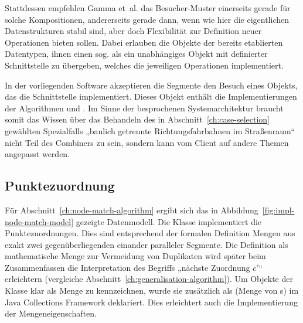 \documentclass[../main/thesis.tex]{subfiles}
\begin{document}
Stattdessen empfehlen Gamma et~al. das Besucher-Muster  einerseits gerade für solche Kompositionen, andererseits gerade dann, wenn wie hier die eigentlichen Datenstrukturen stabil sind, aber doch Flexibilität zur Definition neuer Operationen bieten sollen. 
Dabei erlauben die Objekte der bereits etablierten Datentypen, ihnen einen sog.  als ein unabhängiges Objekt mit definierter Schnittstelle zu übergeben, welches die jeweiligen Operationen implementiert. 

In der vorliegenden Software akzeptieren die Segmente den Besuch eines Objekts, das die Schnittstelle  implementiert.
Dieses Objekt enthält die Implementierungen der Algorithmen  und .
Im Sinne der besprochenen Systemarchitektur braucht somit das Wissen über das Behandeln des in Abschnitt~\ref{ch:case-selection} gewählten Spezialfalls „baulich getrennte Richtungsfahrbahnen im Straßenraum“ nicht Teil des Combiners zu sein, sondern kann vom Client auf andere Themen angepasst werden.



\subsection{Punktezuordnung}
\label{ch:impl-node-match}

Für Abschnitt~\ref{ch:node-match-algorithm} ergibt sich das in Abbildung~\ref{fig:impl-node-match-model} gezeigte Datenmodell.
Die Klasse  implementiert die Punktezuordnungen.
Dies sind entsprechend der formalen Definition Mengen aus exakt zwei gegenüberliegenden  einander paralleler Segmente.
Die Definition als mathematische Menge zur Vermeidung von Duplikaten wird später beim Zusammenfassen die Interpretation des Begriffs „nächste Zuordnung $c'$“ erleichtern (vergleiche Abschnitt~\ref{ch:generalisation-algorithm}).
Um Objekte der Klasse  klar als Menge zu kennzeichnen, wurde sie zusätzlich als  (Menge von s) im Java Collections Framework deklariert.
Dies erleichtert auch die Implementierung der Mengeneigenschaften.

\end{document}

